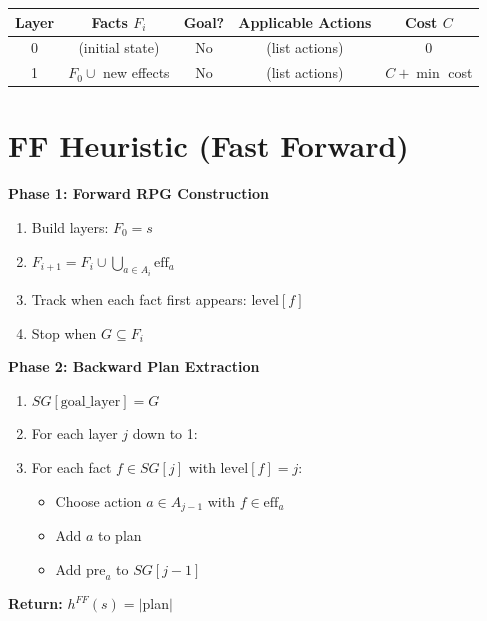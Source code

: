 \documentclass[11pt,a4paper]{article}
\begin{document}
\begin{definitionbox}
\begin{center}
\begin{tabular}{|c|c|c|c|c|}
\hline
\textbf{Layer} & \textbf{Facts $F_i$} & \textbf{Goal?} & \textbf{Applicable Actions} & \textbf{Cost $C$} \\
\hline
0 & (initial state) & No & (list actions) & 0 \\
\hline
1 & $F_0 \cup$ new effects & No & (list actions) & $C + \min$ cost \\
\hline
\end{tabular}
\end{center}
\end{definitionbox}

\section{FF Heuristic (Fast Forward)}

\begin{definitionbox}
\textbf{Phase 1: Forward RPG Construction}
\begin{enumerate}[leftmargin=*,nosep]
\item Build layers: $F_0 = s$
\item $F_{i+1} = F_i \cup \bigcup_{a \in A_i} \text{eff}_a$
\item Track when each fact first appears: $\text{level}[f]$
\item Stop when $G \subseteq F_i$
\end{enumerate}

\textbf{Phase 2: Backward Plan Extraction}
\begin{enumerate}[leftmargin=*,nosep]
\item $SG[\text{goal\_layer}] = G$
\item For each layer $j$ down to 1:
\item For each fact $f \in SG[j]$ with $\text{level}[f] = j$:
\begin{itemize}[nosep]
\item Choose action $a \in A_{j-1}$ with $f \in \text{eff}_a$
\item Add $a$ to plan
\item Add $\text{pre}_a$ to $SG[j-1]$
\end{itemize}
\end{enumerate}

\textbf{Return:} $h^{FF}(s) = |$plan$|$
\end{definitionbox}
\end{document}
